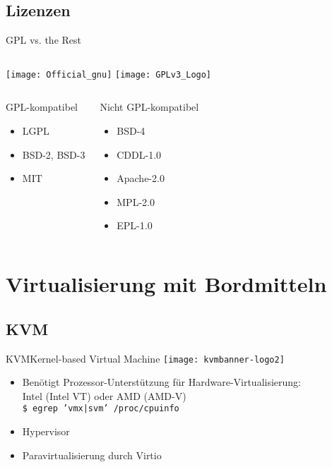 \documentclass[pdflatex, ngerman]{beamer}
\begin{document}
\subsection{Lizenzen}

\begin{frame}{GPL vs. the Rest}
\begin{columns}
\centering\texttt{[image: Official\_gnu]}
\centering\texttt{[image: GPLv3\_Logo]}
\end{columns}
\begin{columns}
\begin{block}{GPL-kompatibel}
  \begin{itemize}
    \item LGPL
    \item BSD-2, BSD-3
    \item MIT
  \end{itemize}
\end{block}
\begin{block}{Nicht GPL-kompatibel}
  \begin{itemize}
    \item BSD-4
    \item CDDL-1.0
    \item Apache-2.0
    \item MPL-2.0
    \item EPL-1.0
  \end{itemize}
\end{block}
\end{columns}
\end{frame}

\section{Virtualisierung mit Bordmitteln}

\subsection{KVM}

\begin{frame}{KVM}{Kernel-based Virtual Machine}
\centering\texttt{[image: kvmbanner-logo2]}
\begin{block}{}
  \begin{itemize}
    \item Benötigt Prozessor-Unterstützung für Hardware-Virtualisierung: \\
    	Intel (Intel VT) oder AMD (AMD-V) \\
        \texttt{\$ egrep 'vmx|svm' /proc/cpuinfo}
    \item Hypervisor
    \item Paravirtualisierung durch Virtio
  \end{itemize}
\end{block}
\end{frame}
\end{document}
